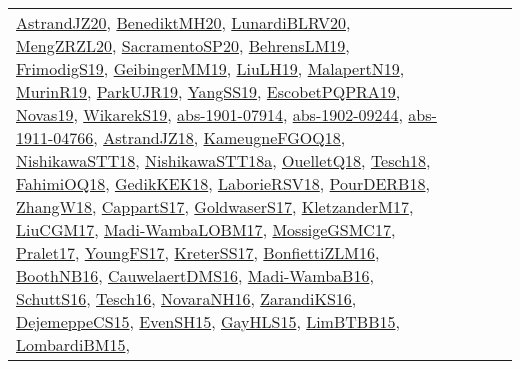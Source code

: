 {\begin{longtable}{lp{3cm}>{\raggedright}p{6cm}>{\raggedright}p{6cm}p{8cm}}
\href{articles/AstrandJZ20.pdf}{AstrandJZ20}\cite{AstrandJZ20}, \href{articles/BenediktMH20.pdf}{BenediktMH20}\cite{BenediktMH20}, \href{articles/LunardiBLRV20.pdf}{LunardiBLRV20}\cite{LunardiBLRV20}, \href{articles/MengZRZL20.pdf}{MengZRZL20}\cite{MengZRZL20}, \href{articles/SacramentoSP20.pdf}{SacramentoSP20}\cite{SacramentoSP20}, \href{papers/BehrensLM19.pdf}{BehrensLM19}\cite{BehrensLM19}, \href{papers/FrimodigS19.pdf}{FrimodigS19}\cite{FrimodigS19}, \href{papers/GeibingerMM19.pdf}{GeibingerMM19}\cite{GeibingerMM19}, \href{papers/LiuLH19.pdf}{LiuLH19}\cite{LiuLH19}, \href{papers/MalapertN19.pdf}{MalapertN19}\cite{MalapertN19}, \href{papers/MurinR19.pdf}{MurinR19}\cite{MurinR19}, \href{papers/ParkUJR19.pdf}{ParkUJR19}\cite{ParkUJR19}, \href{papers/YangSS19.pdf}{YangSS19}\cite{YangSS19}, \href{articles/EscobetPQPRA19.pdf}{EscobetPQPRA19}\cite{EscobetPQPRA19}, \href{articles/Novas19.pdf}{Novas19}\cite{Novas19}, \href{articles/WikarekS19.pdf}{WikarekS19}\cite{WikarekS19}, \href{articles/abs-1901-07914.pdf}{abs-1901-07914}\cite{abs-1901-07914}, \href{articles/abs-1902-09244.pdf}{abs-1902-09244}\cite{abs-1902-09244}, \href{articles/abs-1911-04766.pdf}{abs-1911-04766}\cite{abs-1911-04766}, \href{papers/AstrandJZ18.pdf}{AstrandJZ18}\cite{AstrandJZ18}, \href{papers/KameugneFGOQ18.pdf}{KameugneFGOQ18}\cite{KameugneFGOQ18}, \href{papers/NishikawaSTT18.pdf}{NishikawaSTT18}\cite{NishikawaSTT18}, \href{papers/NishikawaSTT18a.pdf}{NishikawaSTT18a}\cite{NishikawaSTT18a}, \href{papers/OuelletQ18.pdf}{OuelletQ18}\cite{OuelletQ18}, \href{papers/Tesch18.pdf}{Tesch18}\cite{Tesch18}, \href{articles/FahimiOQ18.pdf}{FahimiOQ18}\cite{FahimiOQ18}, \href{articles/GedikKEK18.pdf}{GedikKEK18}\cite{GedikKEK18}, \href{articles/LaborieRSV18.pdf}{LaborieRSV18}\cite{LaborieRSV18}, \href{articles/PourDERB18.pdf}{PourDERB18}\cite{PourDERB18}, \href{articles/ZhangW18.pdf}{ZhangW18}\cite{ZhangW18}, \href{papers/CappartS17.pdf}{CappartS17}\cite{CappartS17}, \href{papers/GoldwaserS17.pdf}{GoldwaserS17}\cite{GoldwaserS17}, \href{papers/KletzanderM17.pdf}{KletzanderM17}\cite{KletzanderM17}, \href{papers/LiuCGM17.pdf}{LiuCGM17}\cite{LiuCGM17}, \href{papers/Madi-WambaLOBM17.pdf}{Madi-WambaLOBM17}\cite{Madi-WambaLOBM17}, \href{papers/MossigeGSMC17.pdf}{MossigeGSMC17}\cite{MossigeGSMC17}, \href{papers/Pralet17.pdf}{Pralet17}\cite{Pralet17}, \href{papers/YoungFS17.pdf}{YoungFS17}\cite{YoungFS17}, \href{articles/KreterSS17.pdf}{KreterSS17}\cite{KreterSS17}, \href{papers/BonfiettiZLM16.pdf}{BonfiettiZLM16}\cite{BonfiettiZLM16}, \href{papers/BoothNB16.pdf}{BoothNB16}\cite{BoothNB16}, \href{papers/CauwelaertDMS16.pdf}{CauwelaertDMS16}\cite{CauwelaertDMS16}, \href{papers/Madi-WambaB16.pdf}{Madi-WambaB16}\cite{Madi-WambaB16}, \href{papers/SchuttS16.pdf}{SchuttS16}\cite{SchuttS16}, \href{papers/Tesch16.pdf}{Tesch16}\cite{Tesch16}, \href{articles/NovaraNH16.pdf}{NovaraNH16}\cite{NovaraNH16}, \href{articles/ZarandiKS16.pdf}{ZarandiKS16}\cite{ZarandiKS16}, \href{papers/DejemeppeCS15.pdf}{DejemeppeCS15}\cite{DejemeppeCS15}, \href{papers/EvenSH15.pdf}{EvenSH15}\cite{EvenSH15}, \href{papers/GayHLS15.pdf}{GayHLS15}\cite{GayHLS15}, \href{papers/LimBTBB15.pdf}{LimBTBB15}\cite{LimBTBB15}, \href{papers/LombardiBM15.pdf}{LombardiBM15}\cite{LombardiBM15}, 
\end{longtable}}
